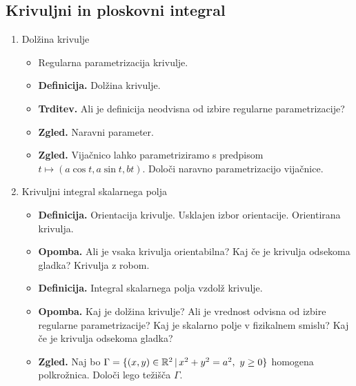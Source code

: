 \subsection{Krivuljni in ploskovni integral}
\begin{enumerate}
    \item Dolžina krivulje
    \begin{itemize}
        \item Regularna parametrizacija krivulje.
        \item \textbf{Definicija.} Dolžina krivulje.
        \item \textbf{Trditev.} Ali je definicija neodvisna od izbire regularne parametrizacije? 
        \item \textbf{Zgled.} Naravni parameter.
        \item \textbf{Zgled.} Vijačnico lahko parametriziramo s predpisom \(t \mapsto (a\cos t, a \sin t, bt)\). Določi naravno parametrizacijo vijačnice.        
    \end{itemize}

    \item Krivuljni integral skalarnega polja
    \begin{itemize}
        \item \textbf{Definicija.} Orientacija krivulje. Usklajen izbor orientacije. Orientirana krivulja.
        \item \textbf{Opomba.} Ali je vsaka krivulja orientabilna? Kaj če je krivulja odsekoma gladka? Krivulja z robom.
        \item \textbf{Definicija.} Integral skalarnega polja vzdolž krivulje.
        \item \textbf{Opomba.} Kaj je dolžina krivulje? Ali je vrednost odvisna od izbire regularne parametrizacije? Kaj je skalarno polje v fizikalnem smislu? Kaj če je krivulja odsekoma gladka?
        \item \textbf{Zgled.} Naj bo \(\Gamma = \{(x,y) \in \mathbb{R}^2 \,|\, x^2+y^2 = a^2, \ y \geq 0\}\) homogena polkrožnica. Določi lego težišča \(\Gamma\).
    \end{itemize}


\end{enumerate}

